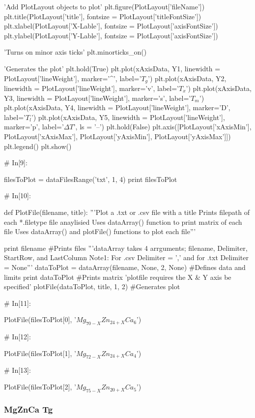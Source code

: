 \documentclass[a4paper,8pt]{article}
\begin{document}
\begin{python}
'Add PlotLayout objects to plot'
plt.figure(PlotLayout['fileName'])
plt.title(PlotLayout['title'], fontsize = PlotLayout['titleFontSize'])
plt.xlabel(PlotLayout['X-Lable'], fontsize = PlotLayout['axisFontSize'])
plt.ylabel(PlotLayout['Y-Lable'], fontsize = PlotLayout['axisFontSize'])

'Turns on minor axis ticks'
plt.minorticks_on()

'Generates the plot'
plt.hold(True)
plt.plot(xAxisData, Y1, linewidth = PlotLayout['lineWeight'],
marker='^', label='$T_{g}$')
plt.plot(xAxisData, Y2, linewidth = PlotLayout['lineWeight'],
marker='v', label='$T_{x}$')
plt.plot(xAxisData, Y3, linewidth = PlotLayout['lineWeight'],
marker='s', label='$T_{m}$')
plt.plot(xAxisData, Y4, linewidth = PlotLayout['lineWeight'],
marker='D', label='$T_{l}$')
plt.plot(xAxisData, Y5, linewidth = PlotLayout['lineWeight'],
marker='p', label='$\Delta T$', ls = '--')
plt.hold(False)
plt.axis([PlotLayout['xAxisMin'], PlotLayout['xAxisMax'], 
PlotLayout['yAxisMin'], PlotLayout['yAxisMax']])
plt.legend()
plt.show()


# In[9]:

filesToPlot = dataFilesRange('txt', 1, 4)
print filesToPlot


# In[10]:

def PlotFile(filename, title):
'''Plot a .txt or .csv file with a title
Prints filepath of each *.filetype file anaylisied 
Uses dataArray() function to print matrix of each file
Uses dataArray() and plotFile() functions to plot each file'''

print filename #Prints files
'''dataArray takes 4 arrguments; filename, Delimiter, StartRow, and LastColumn
Note1: For .csv Delimiter = ',' and for .txt Delimiter = None'''
dataToPlot = dataArray(filename, None, 2, None) #Defines data and limits
print dataToPlot #Prints matrix
'plotfile requires the X & Y axis be specified'
plotFile(dataToPlot, title, 1, 2) #Generates plot


# In[11]:

PlotFile(filesToPlot[0], '$Mg_{70-X}Zn_{24+X}Ca_{6}$')


# In[12]:

PlotFile(filesToPlot[1], '$Mg_{72-X}Zn_{24+X}Ca_{4}$')


# In[13]:

PlotFile(filesToPlot[2], '$Mg_{75-X}Zn_{20+X}Ca_{5}$')
\end{python}

\newpage
\subsubsection{MgZnCa Tg}
\end{document}
